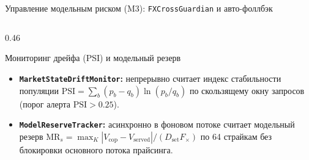 \documentclass[aspectratio=169, 9pt]{beamer}
\begin{document}
\begin{frame}{Управление модельным риском (M3): \texttt{FXCrossGuardian} и авто-фоллбэк}
\begin{columns}[T]
\begin{column}{0.46\textwidth}
      \begin{block}{Мониторинг дрейфа (PSI) и модельный резерв}
        \begin{itemize}
          \item \textbf{\texttt{MarketStateDriftMonitor}:} непрерывно считает индекс стабильности популяции $\text{PSI} = \sum_b (p_b - q_b)\ln(p_b/q_b)$ по скользящему окну запросов (порог алерта $\text{PSI} > 0.25$).
          \item \textbf{\texttt{ModelReserveTracker}:} асинхронно в фоновом потоке считает модельный резерв $\text{MR}_s = \max_K |V_{\text{cop}} - V_{\text{served}}| / (D_{\text{set}} F_\times)$ по 64 страйкам без блокировки основного потока прайсинга.
        \end{itemize}
      \end{block}
    \end{column}
  \end{columns}
\end{frame}
\end{document}
